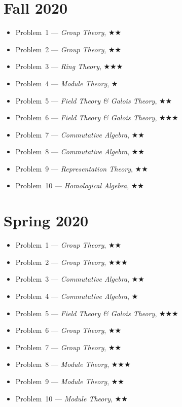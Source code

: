\documentclass[11pt,letterpaper]{book}
\begin{document}
\section*{Fall 2020}
\begin{itemize}
\item Problem~1 --- \textit{Group Theory}, $\bigstar\bigstar$
\item Problem~2 --- \textit{Group Theory}, $\bigstar\bigstar$
\item Problem~3 --- \textit{Ring Theory}, $\bigstar\bigstar\bigstar$
\item Problem~4 --- \textit{Module Theory}, $\bigstar$
\item Problem~5 --- \textit{Field Theory \& Galois Theory}, $\bigstar\bigstar$
\item Problem~6 --- \textit{Field Theory \& Galois Theory}, $\bigstar\bigstar\bigstar$
\item Problem~7 --- \textit{Commutative Algebra}, $\bigstar\bigstar$
\item Problem~8 --- \textit{Commutative Algebra}, $\bigstar\bigstar$
\item Problem~9 --- \textit{Representation Theory}, $\bigstar\bigstar$
\item Problem~10 --- \textit{Homological Algebra}, $\bigstar\bigstar$
\end{itemize}

\section*{Spring 2020}
\begin{itemize}
\item Problem~1 --- \textit{Group Theory}, $\bigstar\bigstar$
\item Problem~2 --- \textit{Group Theory}, $\bigstar\bigstar\bigstar$
\item Problem~3 --- \textit{Commutative Algebra}, $\bigstar\bigstar$
\item Problem~4 --- \textit{Commutative Algebra}, $\bigstar$
\item Problem~5 --- \textit{Field Theory \& Galois Theory}, $\bigstar\bigstar\bigstar$
\item Problem~6 --- \textit{Group Theory}, $\bigstar\bigstar$
\item Problem~7 --- \textit{Group Theory}, $\bigstar\bigstar$
\item Problem~8 --- \textit{Module Theory}, $\bigstar\bigstar\bigstar$
\item Problem~9 --- \textit{Module Theory}, $\bigstar\bigstar$
\item Problem~10 --- \textit{Module Theory}, $\bigstar\bigstar$
\end{itemize}
\end{document}
